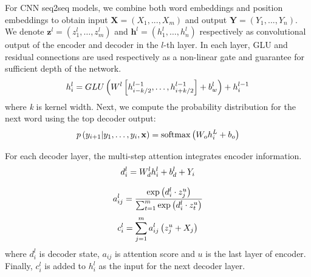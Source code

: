 
For CNN seq2seq models, we combine both word embeddings and position embeddings to obtain input $\mathbf{X} = (X_1,...,X_m)$ and output $\mathbf{Y}=(Y_1,...,Y_n)$. 
We denote $\mathbf { z } ^ { l } = \left( z _ { 1 } ^ { l } , \ldots , z _ { m     } ^ { l } \right)$ and $\mathbf { h } ^ { l } = \left( h _ { 1 } ^ { l } , \ldots , h _ { n } ^ { l } \right)$ 
respectively as convolutional output of the encoder and
decoder in the $l$-th layer.
In each layer, GLU \cite{DauphinFAG17} and residual connections \cite{HeZRS16}
are used respectively as a non-linear gate and guarantee for sufficient depth of the network.  
\begin{equation}
\small
    h _ { i } ^ { l } = GLU \left( W ^ { l } \left[ h _ {i-k/2 } ^ { l - 1 } , \ldots , h _ { i+k/2 } ^ { l - 1 } \right] + b _ { w } ^ { l } \right) + h _ { i } ^ { l - 1 }
\end{equation} 
where \textit{k} is kernel width.
Next, we compute the probability distribution for the next word
using the top decoder output:
\begin{equation}
\small
    p \left( y _ { i + 1 } | y _ { 1 } , \ldots , y _ { i } , \mathbf { x } \right) = \operatorname { softmax } \left( W _ { o } h _ { i } ^ { L } + b _ { o } \right)
\end{equation}

For each decoder layer, the multi-step attention integrates encoder information. 
\begin{equation}
\small
    d _ { i } ^ { l } = W _ { d } ^ { l } h _ { i } ^ { l } + b _ { d } ^ { l } + Y _ { i }
\end{equation}

\begin{equation}\label{eq:a}
\small
    a _ { i j } ^ { l } = \frac { \exp \left( d _ { i } ^ { l } \cdot z _ { j } ^ { u } \right) } { \sum _ { t = 1 } ^ { m } \exp \left( d _ { i } ^ { l } \cdot z _ { t } ^ { u } \right) }
\end{equation}
\begin{equation}\label{eq:c}
\small
    c _ { i } ^ { l } = \sum _ { j = 1 } ^ { m } a _ { i j } ^ { l } \left( z _ { j } ^ { u } + X_j \right)
\end{equation}
where $d_{i}^{l}$ is decoder state, $a_{ij}$ is attention score
and $u$ is the last layer of encoder.  
Finally, $c _ { i } ^ { l }$ is added to $h_{i}^{l}$ as the input for the next decoder layer.

